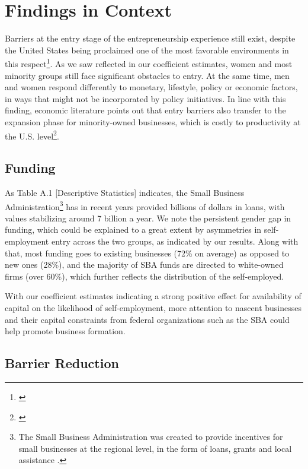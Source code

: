 \section{Findings in Context}

Barriers at the entry stage of the entrepreneurship experience still exist, despite the United States being proclaimed one of the most favorable environments in this respect\footnote{\cite{Autio2007}}. As we saw reflected in our coefficient estimates, women and most minority groups still face significant obstacles to entry. At the same time, men and women respond differently to monetary, lifestyle, policy or economic factors, in ways that might not be incorporated by policy initiatives. In line with this finding, economic literature points out that entry barriers also transfer to the expansion phase for minority-owned businesses, which is costly to productivity at the U.S. level\footnote{\cite{ReynoldsWhite1997}}. 

\subsection{Funding}

As Table A.1 [Descriptive Statistics] indicates, the Small Business Administration\footnote{The Small Business Administration was created to provide incentives for small businesses at the regional level, in the form of loans, grants and local assistance \cite{SBA}.} has in recent years provided billions of dollars in loans, with values stabilizing around 7 billion a year. We note the persistent gender gap in funding, which could be explained to a great extent by asymmetries in self-employment entry across the two groups, as indicated by our results. Along with that, most funding goes to existing businesses (72\% on average) as opposed to new ones (28\%), and the majority of SBA funds are directed to white-owned firms (over 60\%), which further reflects the distribution of the self-employed. 

With our coefficient estimates indicating a strong positive effect for availability of capital on the likelihood of self-employment, more attention to nascent businesses and their capital constraints from federal organizations such as the SBA could help promote business formation. 

\subsection{Barrier Reduction}

